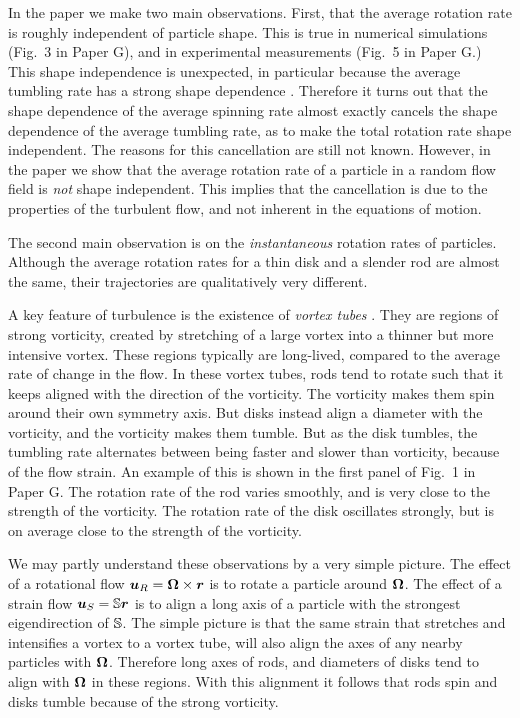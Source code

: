 \documentclass[thesis.tex]{subfiles}
\begin{document}
In the paper we make two main observations. First, that the average rotation rate is roughly independent of particle shape. This is true in numerical simulations (Fig.~3 in Paper G), and in experimental measurements (Fig.~5 in Paper G.) This shape independence is unexpected, in particular because the average tumbling rate has a strong shape dependence \cite{parsa2012,gustavsson2014}. Therefore it turns out that the shape dependence of the average spinning rate almost exactly cancels the shape dependence of the average tumbling rate, as to make the total rotation rate shape independent. The reasons for this cancellation are still not known. However, in the paper we show that the average rotation rate of a particle in a random flow field is \emph{not} shape independent. This implies that the cancellation is due to the properties of the turbulent flow, and not inherent in the equations of motion.

The second main observation is on the \emph{instantaneous} rotation rates of particles. Although the average rotation rates for a thin disk and a slender rod are almost the same, their trajectories are qualitatively very different.

A key feature of turbulence is the existence of \emph{vortex tubes} \cite{she1990}. They are regions of strong vorticity, created by stretching of a large vortex into a thinner but more intensive vortex. These regions typically are long-lived, compared to the average rate of change in the flow. In these vortex tubes, rods tend to rotate such that it keeps aligned with the direction of the vorticity. The vorticity makes them spin around their own symmetry axis. But disks instead align a diameter with the vorticity, and the vorticity makes them tumble. But as the disk tumbles, the tumbling rate alternates between being faster and slower than vorticity, because of the flow strain. An example of this is shown in the first panel of Fig.~1 in Paper G. The rotation rate of the rod varies smoothly, and is very close to the strength of the vorticity. The rotation rate of the disk oscillates strongly, but is on average close to the strength of the vorticity.

We may partly understand these observations by a very simple picture. The effect of a rotational flow $\mbox{\boldmath$u$}_R= \mbox{\boldmath$\Omega$} \times \mbox{\boldmath$r$}$ is to rotate a particle around $\mbox{\boldmath$\Omega$}$. The effect of a strain flow $\mbox{\boldmath$u$}_S=\mathbb{S} \mbox{\boldmath$r$}$ is to align a long axis of a particle with the strongest eigendirection of $\mathbb{S}$. The simple picture is that the same strain that stretches and intensifies a vortex to a vortex tube, will also align the axes of any nearby particles with $\mbox{\boldmath$\Omega$}$. Therefore long axes of rods, and diameters of disks tend to align with $\mbox{\boldmath$\Omega$}$ in these regions. With this alignment it follows that rods spin and disks tumble because of the strong vorticity.
\end{document}
